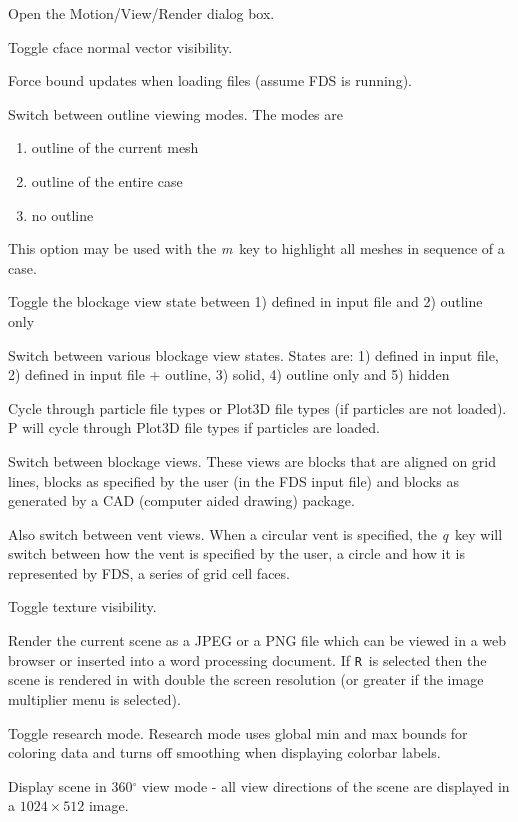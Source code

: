 \documentclass[11pt,twoside]{book}
\newcommand{\kitem}[1]{\item[{\bf {\tt #1 \  }} \hfill]}
\begin{document}
\kitem{ALT m}Open the Motion/View/Render dialog box.

\kitem{n}Toggle cface normal vector visibility.

\kitem{N}Force bound updates when loading files (assume FDS is running).

\kitem{o}Switch between outline viewing modes. The modes are
\begin{enumerate}
\item outline of the current mesh
\item outline of the entire case
\item no outline
\end{enumerate}
This option may be used with the {\em m}\ key to highlight all meshes in sequence of a case.

\kitem{O}Toggle the blockage view state between 1) defined in input file and 2) outline only

\kitem{ALT o}Switch between various blockage view states.  States are:
1) defined in input file,
2) defined in input file + outline,
3) solid,
4) outline only and
5) hidden

\kitem{p, P}Cycle through particle file types or Plot3D file types (if particles are not loaded).
P will cycle through Plot3D file types if particles are loaded.

\kitem{q}Switch between blockage views.  These views are blocks
that are aligned on grid lines, blocks as specified by the user
(in the FDS input file) and blocks as generated by a CAD (computer
aided drawing) package.

Also switch between vent views.  When a circular vent is specified,
the {\em q}\ key will switch between how the vent is specified by the user, a circle
and how it is represented by FDS, a series of grid cell faces.

\kitem{Q}Toggle texture visibility.

\kitem{r,R}Render the current scene as a JPEG or a PNG file which
can be viewed in a web browser or inserted into a word processing
document.  If {\tt R}\ is selected then the
scene is rendered in with double the screen resolution (or greater if the image multiplier menu is selected).

\kitem{ALT r}Toggle research mode.  Research mode uses global min
and max bounds for coloring data and turns off smoothing when displaying colorbar labels.

\kitem{ALT R}Display scene in 360$^\circ$ view mode - all view directions of the scene are displayed in a $1024\times 512$ image.
\end{document}
